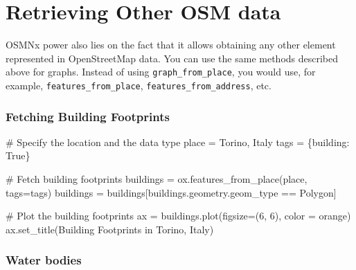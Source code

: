 \documentclass[
  letterpaper,
  DIV=11,
  numbers=noendperiod]{scrreprt}
\newenvironment{Shaded}{\begin{snugshade}}{\end{snugshade}}
\newcommand{\CommentTok}[1]{\textcolor[rgb]{0.37,0.37,0.37}{#1}}
\newcommand{\DecValTok}[1]{\textcolor[rgb]{0.68,0.00,0.00}{#1}}
\newcommand{\NormalTok}[1]{\textcolor[rgb]{0.00,0.23,0.31}{#1}}
\newcommand{\OperatorTok}[1]{\textcolor[rgb]{0.37,0.37,0.37}{#1}}
\newcommand{\StringTok}[1]{\textcolor[rgb]{0.13,0.47,0.30}{#1}}
\newcommand{\VariableTok}[1]{\textcolor[rgb]{0.07,0.07,0.07}{#1}}
\begin{document}
\section{Retrieving Other OSM data}\label{retrieving-other-osm-data}

OSMNx power also lies on the fact that it allows obtaining any other
element represented in OpenStreetMap data. You can use the same methods
described above for graphs. Instead of using
\texttt{graph\_from\_place}, you would use, for example,
\texttt{features\_from\_place}, \texttt{features\_from\_address}, etc.

\subsubsection{Fetching Building
Footprints}\label{fetching-building-footprints}

\begin{Shaded}
\begin{Highlighting}[]
\CommentTok{\# Specify the location and the data type}
\NormalTok{place }\OperatorTok{=} \StringTok{\textquotesingle{}Torino, Italy\textquotesingle{}}
\NormalTok{tags }\OperatorTok{=}\NormalTok{ \{}\StringTok{\textquotesingle{}building\textquotesingle{}}\NormalTok{: }\VariableTok{True}\NormalTok{\}}

\CommentTok{\# Fetch building footprints}
\NormalTok{buildings }\OperatorTok{=}\NormalTok{ ox.features\_from\_place(place, tags}\OperatorTok{=}\NormalTok{tags)}
\NormalTok{buildings }\OperatorTok{=}\NormalTok{ buildings[buildings.geometry.geom\_type }\OperatorTok{==} \StringTok{\textquotesingle{}Polygon\textquotesingle{}}\NormalTok{]}

\CommentTok{\# Plot the building footprints}
\NormalTok{ax }\OperatorTok{=}\NormalTok{ buildings.plot(figsize}\OperatorTok{=}\NormalTok{(}\DecValTok{6}\NormalTok{, }\DecValTok{6}\NormalTok{), color }\OperatorTok{=} \StringTok{\textquotesingle{}orange\textquotesingle{}}\NormalTok{)}
\NormalTok{ax.set\_title(}\StringTok{\textquotesingle{}Building Footprints in Torino, Italy\textquotesingle{}}\NormalTok{)}
\end{Highlighting}
\end{Shaded}

\subsubsection{Water bodies}\label{water-bodies}
\end{document}
